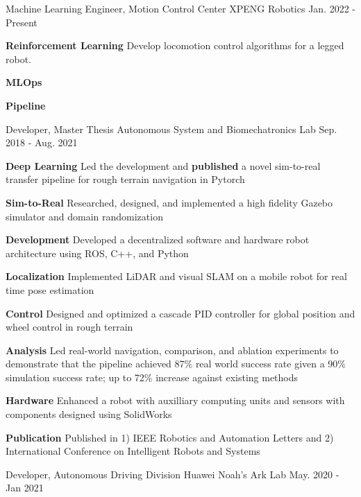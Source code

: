 \begin{cventries}
	\cventry
	{Machine Learning Engineer, Motion Control Center}
	{XPENG Robotics}
	{Jan. 2022 - Present}
	{}
	{
		\begin{cvitems}
			\item {
				\textbf{Reinforcement Learning} Develop locomotion control algorithms for a legged robot.
			}
			\item {
				\textbf{MLOps} 
			}
			\item {
				\textbf{Pipeline} 
			}
		\end{cvitems}
	}
	\cventry
	{Developer, Master Thesis}
	{Autonomous System and Biomechatronics Lab}
	{Sep. 2018 - Aug. 2021}
	{}
	{
		\begin{cvitems}
			\item {
				\textbf{Deep Learning} Led the development and \textbf{published} a novel sim-to-real transfer pipeline for rough terrain navigation in Pytorch
			}
			\item {
				\textbf{Sim-to-Real} Researched, designed, and implemented a high fidelity Gazebo simulator and domain randomization
			}
			\item {
				\textbf{Development} Developed a decentralized software and hardware robot architecture using ROS, C++, and Python
			}
			\item {
				\textbf{Localization} Implemented LiDAR and visual SLAM on a mobile robot for real time pose estimation
			}
			\item {
				\textbf{Control} Designed and optimized a cascade PID controller for global position and wheel control in rough terrain
			}
			\item {
				\textbf{Analysis} Led real-world navigation, comparison, and ablation experiments to demonstrate that the pipeline achieved 87\% real world success rate given a 90\% simulation success rate; up to 72\% increase against existing methods
			}
			\item {
				\textbf{Hardware} Enhanced a robot with auxilliary computing units and sensors with components designed using SolidWorks
			}
			\item {
				\textbf{Publication} Published in 1) IEEE Robotics and Automation Letters and 2) International Conference on Intelligent Robots and Systems
			}
		\end{cvitems}
	}
	\cventry
	{Developer, Autonomous Driving Division}
	{Huawei Noah’s Ark Lab}
	{May. 2020 - Jan 2021}
	{}

\end{cventries}
